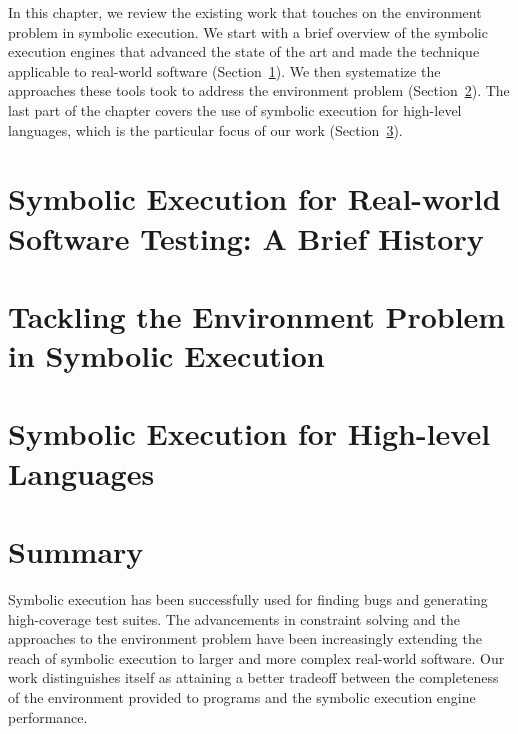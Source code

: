 In this chapter, we review the existing work that touches on the environment problem in symbolic execution.
%
We start with a brief overview of the symbolic execution engines that advanced the state of the art and made the technique applicable to real-world software (Section~\ref{sec:relwork:atcg}).
%
We then systematize the approaches these tools took to address the environment problem (Section~\ref{sec:relwork:envproblem}).
%
The last part of the chapter covers the use of symbolic execution for high-level languages, which is the particular focus of our work (Section~\ref{sec:relwork:interplang}).


\section{Symbolic Execution for Real-world Software Testing: A Brief History}
\label{sec:relwork:atcg}


\section{Tackling the Environment Problem in Symbolic Execution}
\label{sec:relwork:envproblem}


\iffalse
\section{Path Explosion Mitigation}
\label{sec:relwork:pathexpl}

\fi

\section{Symbolic Execution for High-level Languages}
\label{sec:relwork:interplang}


\section{Summary}

Symbolic execution has been successfully used for finding bugs and generating high-coverage test suites.
%
The advancements in constraint solving and the approaches to the environment problem have been increasingly extending the reach of symbolic execution to larger and more complex real-world software.
%
Our work distinguishes itself as attaining a better tradeoff between the completeness of the environment provided to programs and the symbolic execution engine performance.


